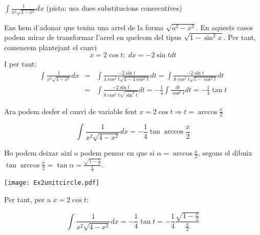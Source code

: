 \Exercise[title=Substitució]
$\int \frac{1}{x^2 \sqrt{4-x^2}}dx$ (pista: usa dues substitucions consecutives)


\Answer
Ens hem d'adonar que tenim una arrel de la forma $\sqrt{a^2-x^2}$. En aquests casos podem mirar de transformar l'arrel en quelcom del tipus $\sqrt{1-\sin^2{x}}$. Per tant, comencem plantejant el canvi
\[
  x=2\cos{t}; \; dx=-2\sin{t}dt
\]
I per tant:
\begin{eqnarray*}
  \int \frac{1}{x^2 \sqrt{4-x^2}}dx
  &=& \int \frac{-2\sin{t}}{4\cos^2{t}\sqrt{4-4\cos^2{t}}} dt = \int \frac{-2\sin{t}}{8\cos^2{t}\sqrt{1-\cos^2{t}}} dt\\
  &=& \int \frac{-2\sin{t}}{8\cos^2{t}\sqrt{\sin^2{t}}} dt = -\frac{1}{4} \int \frac{dt}{\cos^2{t}} dt=-\frac{1}{4} \tan{t}
\end{eqnarray*}

Ara podem desfer el canvi de variable fent $x=2\cos{t} \Rightarrow t=\arccos{\frac{x}{2}}$

\[
  \int \frac{1}{x^2 \sqrt{4-x^2}}dx=-\frac{1}{4} \tan{\arccos{\frac{x}{2}}}
\]

Ho podem deixar així o podem pensar en que si $\alpha=\arccos{\frac{x}{2}}$, segons el dibuix  $\tan{\arccos{\frac{x}{2}}}=\tan{\alpha}=\frac{\sqrt{1-\frac{x}{2}}}{\frac{x}{2}}$.

\begin{center}
  \texttt{[image: Ex2unitcircle.pdf]}
\end{center}

Per tant, per a $x=2\cos{t}$: 

\[
\int \frac{1}{x^2 \sqrt{4-x^2}}dx = -\frac{1}{4} \tan{t} = -\frac{1}{4}\frac{\sqrt{1-\frac{x}{2}}}{\frac{x}{2}}
\]

